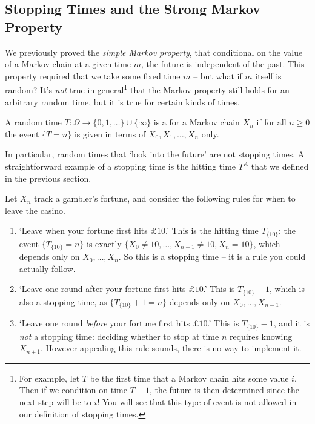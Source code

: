 \documentclass[a4paper]{scrartcl}
\begin{document}
\subsection{Stopping Times and the Strong Markov Property}

We previously proved the \emph{simple Markov property}, that 
conditional on the value of a Markov chain at a given time $m$, the future is independent of the past.
This property required that we take some fixed time $m$ -- but what if $m$ itself is random? It's \emph{not} true in general\footnote{For example, let $T$ be the first time that a Markov chain hits some value $i$. Then if we condition on time $T - 1$, the future is then determined since the next step will be to $i$! You will see that this type of event is not allowed in our definition of stopping times.} that the Markov property still holds for an arbitrary random time, but it is true for certain kinds of times.

\begin{definition}
	A random time $T : \Omega \rightarrow \{0, 1, \dots\} \cup \{\infty\}$ is a  for a Markov chain $X_n$ if for all $n \geq 0$ the event $\{T = n\}$ is given in terms of $X_0, X_1, \dots, X_n$ only.
\end{definition}

In particular, random times that `look into the future' are not stopping times. A straightforward example of a stopping time is the hitting time $T^A$ that we defined in the previous section.

\begin{example}
	Let $X_n$ track a gambler's fortune, and consider the following rules for when to leave the casino.
	\begin{enumerate}[label=(\roman*)]
		\item `Leave when your fortune first hits $\pounds 10$.' This is the hitting time $T_{\{10\}}$: the event $\{T_{\{10\}} = n\}$ is exactly $\{X_0 \neq 10, \dots, X_{n - 1} \neq 10, X_n = 10\}$, which depends only on $X_0, \dots, X_n$. So this is a stopping time -- it is a rule you could actually follow.
		\item `Leave one round after your fortune first hits $\pounds 10$.' This is $T_{\{10\}} + 1$, which is also a stopping time, as $\{T_{\{10\}} + 1 = n\}$ depends only on $X_0, \dots, X_{n - 1}$.
		\item `Leave one round \emph{before} your fortune first hits $\pounds 10$.' This is $T_{\{10\}} - 1$, and it is \emph{not} a stopping time: deciding whether to stop at time $n$ requires knowing $X_{n + 1}$. However appealing this rule sounds, there is no way to implement it.
	\end{enumerate}
\end{example}
\end{document}
